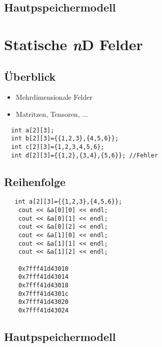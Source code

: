 \documentclass[16pt]{beamer}
\begin{document}
\subsection{Hautpspeichermodell}
\begin{frame}
\end{frame}

\section{Statische \protect\textit{n}D Felder}
\subsection{Überblick}
\begin{frame}[fragile]
  \begin{itemize}
    \item Mehrdimensionale Felder
    \item Matritzen, Tensoren, ...
  \end{itemize}
  \begin{lstlisting}
  int a[2][3];
  int b[2][3]={{1,2,3},{4,5,6}};
  int c[2][3]={1,2,3,4,5,6};
  int d[2][3]={{1,2},{3,4},{5,6}}; //Fehler
  \end{lstlisting}
\end{frame}

\subsection{Reihenfolge}
\begin{frame}[fragile]
  \begin{lstlisting}
   int a[2][3]={{1,2,3},{4,5,6}};
	cout << &a[0][0] << endl;
	cout << &a[0][1] << endl;
	cout << &a[0][2] << endl;
	cout << &a[1][0] << endl;
	cout << &a[1][1] << endl;
	cout << &a[1][2] << endl;

	0x7fff41d43010
	0x7fff41d43014
	0x7fff41d43018
	0x7fff41d4301c
	0x7fff41d43020
	0x7fff41d43024
  \end{lstlisting}
\end{frame}

\subsection{Hautpspeichermodell}
\begin{frame}
\end{frame}
\end{document}

